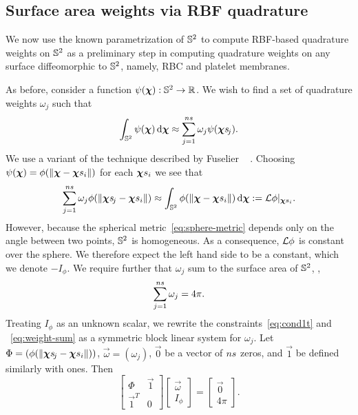 \subsection{Surface area weights via RBF quadrature}\label{sec:rbf-quadrature}

We now use the known parametrization of $\mathbb{S}^2$ to compute RBF-based quadrature weights
on $\mathbb{S}^2$ as a preliminary step in computing quadrature weights on any surface
diffeomorphic to $\mathbb{S}^2$, namely, RBC and platelet membranes.

As before, consider a function $\psi(\boldsymbol{\chi}):\mathbb{S}^2 \to \mathbb{R}$. We wish to find a set
of quadrature weights $\omega_j$ such that
\begin{equation*}
    \int_{\sphere} \psi(\Xp) \d\Xp \approx \sum_{j=1}^{\sample\cardinality} \omega_j \psi(\Xpsj).
\end{equation*}
We use a variant of the technique described by Fuselier ~%
\cite{Fuselier:2013coba}.  Choosing $\psi(\Xp) = \phi(\|\Xp-\sample\Xp_i\|)$ for each
$\sample\Xp_i$ we see that
\begin{equation}
    \sum_{j=1}^{\sample\cardinality} \omega_j \phi(\|\Xpsj-\sample\Xp_i\|)
    \approx \int_{\sphere}\phi(\|\Xp-\sample\Xp_i\|) \d\Xp := \L\phi|_{\sample\Xp_i}.
    \label{eq:cond1t}
\end{equation}
However, because the spherical metric~\eqref{eq:sphere-metric} depends only on the angle
between two points, $\mathbb{S}^2$ is homogeneous. As a consequence, $\mathcal{L}\phi$ is constant over
the sphere. We therefore expect the left hand side to be a constant, which we denote
$-I_\phi$. We require further that $\omega_j$ sum to the surface area of $\mathbb{S}^2$,
,
\begin{equation}
    \sum_{j=1}^{\sample\cardinality} \omega_j  = 4\pi.
    \label{eq:weight-sum}
\end{equation}
Treating $I_\phi$ as an unknown scalar, we rewrite the constraints~\eqref{eq:cond1t} and%
~\eqref{eq:weight-sum} as a symmetric block linear system for $\omega_j$. Let
$\Phi = (\phi(\|\Xpsj - \sample\Xp_i\|))$, $\vec{\omega} = (\omega_j)$, $\vec{0}$ 
be a vector of $\sample\cardinality$ zeros, and $\vec{1}$ be defined similarly with ones.
Then
\begin{equation}\label{eq:rbf-quadrature}
    \left[\begin{array}{cc}
            \Phi & \vec{1} \\ \vec{1}^T & 0
    \end{array}\right]\left[\begin{array}{cc}
            \vec{\omega} \\ I_\phi
    \end{array}\right] = \left[\begin{array}{c}
            \vec{0} \\ 4\pi
    \end{array}\right].
\end{equation}
